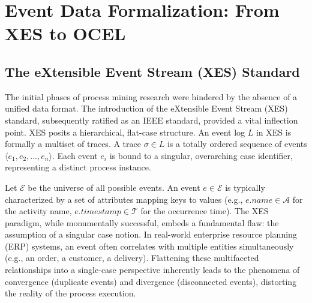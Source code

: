 \section{Event Data Formalization: From XES to OCEL}
\subsection{The eXtensible Event Stream (XES) Standard}
The initial phases of process mining research were hindered by the absence of a unified data format. The introduction of the eXtensible Event Stream (XES) standard, subsequently ratified as an IEEE standard, provided a vital inflection point. XES posits a hierarchical, flat-case structure. An event log $L$ in XES is formally a multiset of traces. A trace $\sigma \in L$ is a totally ordered sequence of events $\langle e_1, e_2, \dots, e_n \rangle$. Each event $e_i$ is bound to a singular, overarching case identifier, representing a distinct process instance.

Let $\mathcal{E}$ be the universe of all possible events. An event $e \in \mathcal{E}$ is typically characterized by a set of attributes mapping keys to values (e.g., $e.name \in \mathcal{A}$ for the activity name, $e.timestamp \in \mathcal{T}$ for the occurrence time). The XES paradigm, while monumentally successful, embeds a fundamental flaw: the assumption of a singular case notion. In real-world enterprise resource planning (ERP) systems, an event often correlates with multiple entities simultaneously (e.g., an order, a customer, a delivery). Flattening these multifaceted relationships into a single-case perspective inherently leads to the phenomena of convergence (duplicate events) and divergence (disconnected events), distorting the reality of the process execution.

